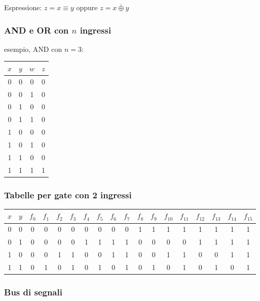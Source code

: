 \documentclass{subfiles}
\begin{document}
\noindent
Espressione: $z = x \equiv y$ oppure $z = \overline{x \oplus y}$

\subsubsection{AND e OR con $n$ ingressi}

esempio, AND con $n=3$:

\begin{center}
\begin{tabular}{ |c|c|c|c| }
\hline
$x$ & $y$ & $w$ & $z$ \\
\hline
\hline
0 & 0 & 0 & 0 \\
0 & 0 & 1 & 0 \\
0 & 1 & 0 & 0 \\
0 & 1 & 1 & 0 \\
1 & 0 & 0 & 0 \\
1 & 0 & 1 & 0 \\
1 & 1 & 0 & 0 \\
1 & 1 & 1 & 1 \\
\hline
\end{tabular}
\end{center}

\subsubsection{Tabelle per gate con 2 ingressi}

\begin{center}
\begin{tabular}{ |c|c|c|c|c|c|c|c|c|c|c|c|c|c|c|c|c|c| }
\hline
$x$ & $y$ & $f_0$ & $f_1$ & $f_2$ & $f_3$ & $f_4$ & $f_5$ & $f_6$ & $f_7$ & $f_8$ & $f_9$ & $f_{10}$ & $f_{11}$ & $f_{12}$ & $f_{13}$ & $f_{14}$ & $f_{15}$ \\
\hline
\hline
0 & 0 & 0 & 0 & 0 & 0 & 0 & 0 & 0 & 0 & 1 & 1 & 1 & 1 & 1 & 1 & 1 & 1 \\
0 & 1 & 0 & 0 & 0 & 0 & 1 & 1 & 1 & 1 & 0 & 0 & 0 & 0 & 1 & 1 & 1 & 1 \\
1 & 0 & 0 & 0 & 1 & 1 & 0 & 0 & 1 & 1 & 0 & 0 & 1 & 1 & 0 & 0 & 1 & 1 \\
1 & 1 & 0 & 1 & 0 & 1 & 0 & 1 & 0 & 1 & 0 & 1 & 0 & 1 & 0 & 1 & 0 & 1 \\
\hline
\end{tabular}
\end{center}

\subsubsection{Bus di segnali}
\end{document}
